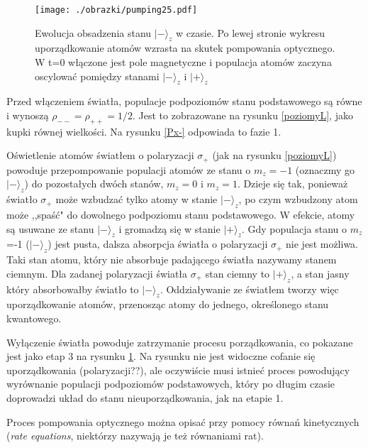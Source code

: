 \documentclass[a4paper,10pt,twoside]{report}
\begin{document}
\begin{figure}[h!]
\begin{center}
 \texttt{[image: ./obrazki/pumping25.pdf]}
\end{center}
\caption{ Ewolucja obsadzenia stanu $\lvert - \rangle_z$ w czasie. Po lewej stronie wykresu uporządkowanie atomów wzrasta na skutek pompowania optycznego. W t=0 włączone jest pole magnetyczne i populacja atomów zaczyna oscylować pomiędzy stanami $\lvert - \rangle_z$ i $\lvert + \rangle_z$ }
\label{fig:Px-}
\end{figure}

Przed włączeniem światła, populacje podpoziomów stanu podstawowego są równe i wynoszą $\rho_{--}=\rho_{++}=1/2$. Jest to zobrazowane na rysunku \ref{poziomyL}, jako kupki równej wielkości. Na rysunku \ref{Px-} odpowiada to fazie 1. 

Oświetlenie atomów światłem o polaryzacji $\sigma_+$ (jak na rysunku \ref{poziomyL}) powoduje przepompowanie populacji atomów ze stanu o $m_z=-1$ (oznaczmy go $\lvert - \rangle_z$) do pozostałych dwóch stanów, $m_z=0$ i $m_z=1$. Dzieje się tak, ponieważ światło $\sigma_+$ może wzbudzać tylko atomy w stanie $\lvert - \rangle_z$, po czym wzbudzony atom może ,,spaść" do dowolnego podpoziomu stanu podstawowego. W efekcie, atomy są usuwane ze stanu $\lvert - \rangle_z$ i gromadzą się w stanie $\lvert + \rangle_z$. Gdy populacja stanu o $m_z$=-1 ($\lvert - \rangle_z$) jest pusta, dalsza absorpcja światła o polaryzacji $\sigma_+$ nie jest możliwa. Taki stan atomu, który nie absorbuje padającego światła  nazywamy stanem ciemnym. Dla zadanej polaryzacji  światła $\sigma_+$ stan ciemny to $\lvert + \rangle_z$, a stan jasny który absorbowałby światło to $\lvert - \rangle_z$. Oddziaływanie ze światłem tworzy więc uporządkowanie atomów, przenosząc atomy do jednego, określonego stanu kwantowego.
 
Wyłączenie światła powoduje zatrzymanie procesu porządkowania, co pokazane jest jako etap 3 na rysunku \ref{fig:Px-}. Na rysunku nie jest widoczne cofanie się uporządkowania (polaryzacji??), ale oczywiście musi istnieć proces powodujący wyrównanie populacji podpoziomów podstawowych, który po długim czasie doprowadzi układ do stanu nieuporządkowania, jak na etapie 1.

Proces pompowania optycznego można opisać przy pomocy równań kinetycznych (\emph{rate equations}, niektórzy nazywają je też równaniami rat).
\end{document}
